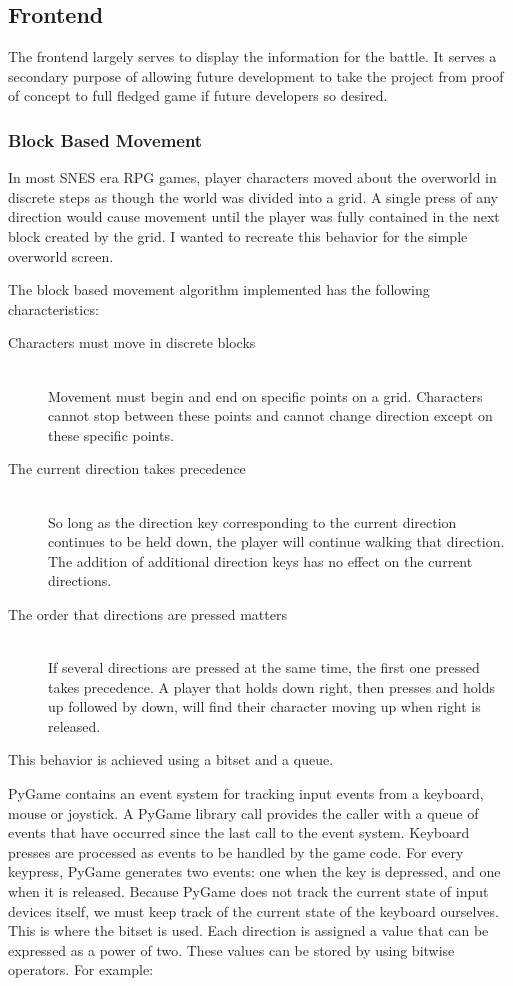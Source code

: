 \documentclass[11pt]{article}
\begin{document}
\subsection{Frontend}

The frontend largely serves to display the information for the battle.  It serves a secondary purpose of allowing future development to take the project from proof of concept to full fledged game if future developers so desired.

\subsubsection{Block Based Movement}

In most SNES era RPG games, player characters moved about the overworld in discrete steps as though the world was divided into a grid.  A single press of any direction would cause movement until the player was fully contained in the next block created by the grid.  I wanted to recreate this behavior for the simple overworld screen.

The block based movement algorithm implemented has the following characteristics:
\begin{description}
   \item[Characters must move in discrete blocks] \hfill \\
   Movement must begin and end on specific points on a grid.  Characters cannot stop between these points and cannot change direction except on these specific points. 
   \item[The current direction takes precedence] \hfill \\
   So long as the direction key corresponding to the current direction continues to be held down, the player will continue walking that direction.  The addition of additional direction keys has no effect on the current directions.
   \item[The order that directions are pressed matters] \hfill \\
   If several directions are pressed at the same time, the first one pressed takes precedence.  A player that holds down right, then presses and holds up followed by down, will find their character moving up when right is released.
\end{description}

This behavior is achieved using a bitset and a queue.  

PyGame contains an event system for tracking input events from a keyboard, mouse or joystick.  A PyGame library call provides the caller with a queue of events that have occurred since the last call to the event system.  Keyboard presses are processed as events to be handled by the game code.  For every keypress, PyGame generates two events: one when the key is depressed, and one when it is released.  Because PyGame does not track the current state of input devices itself, we must keep track of the current state of the keyboard ourselves.  This is where the bitset is used.  Each direction is assigned a value that can be expressed as a power of two. These values can be stored by using bitwise operators.  For example:
\end{document}
